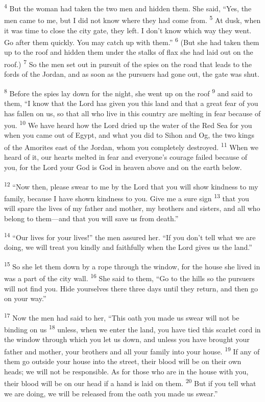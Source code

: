 \documentclass[12pt,twoside]{article}
\newcommand{\vs}[1]{\textsuperscript{#1}}
\begin{document}
\vs{4} But the woman had taken the two men and hidden them. She said, ``Yes, the men came to me, but I did not know where they had come from.
\vs{5} At dusk, when it was time to close the city gate, they left. I don't know which way they went. Go after them quickly. You may catch up with them.''
\vs{6} (But she had taken them up to the roof and hidden them under the stalks of flax she had laid out on the roof.)
\vs{7} So the men set out in pursuit of the spies on the road that leads to the fords of the Jordan, and as soon as the pursuers had gone out, the gate was shut.

\vs{8} Before the spies lay down for the night, she went up on the roof
\vs{9} and said to them, ``I know that the Lord has given you this land and that a great fear of you has fallen on us, so that all who live in this country are melting in fear because of you.
\vs{10} We have heard how the Lord dried up the water of the Red Sea for you when you came out of Egypt, and what you did to Sihon and Og, the two kings of the Amorites east of the Jordan, whom you completely destroyed.
\vs{11} When we heard of it, our hearts melted in fear and everyone's courage failed because of you, for the Lord your God is God in heaven above and on the earth below.

\vs{12} ``Now then, please swear to me by the Lord that you will show kindness to my family, because I have shown kindness to you. Give me a sure sign
\vs{13} that you will spare the lives of my father and mother, my brothers and sisters, and all who belong to them---and that you will save us from death.''

\vs{14} ``Our lives for your lives!'' the men assured her. ``If you don't tell what we are doing, we will treat you kindly and faithfully when the Lord gives us the land.''

\vs{15} So she let them down by a rope through the window, for the house she lived in was a part of the city wall.
\vs{16} She said to them, ``Go to the hills so the pursuers will not find you. Hide yourselves there three days until they return, and then go on your way.''

\vs{17} Now the men had said to her, ``This oath you made us swear will not be binding on us
\vs{18} unless, when we enter the land, you have tied this scarlet cord in the window through which you let us down, and unless you have brought your father and mother, your brothers and all your family into your house.
\vs{19} If any of them go outside your house into the street, their blood will be on their own heads; we will not be responsible. As for those who are in the house with you, their blood will be on our head if a hand is laid on them.
\vs{20} But if you tell what we are doing, we will be released from the oath you made us swear.''
\end{document}
